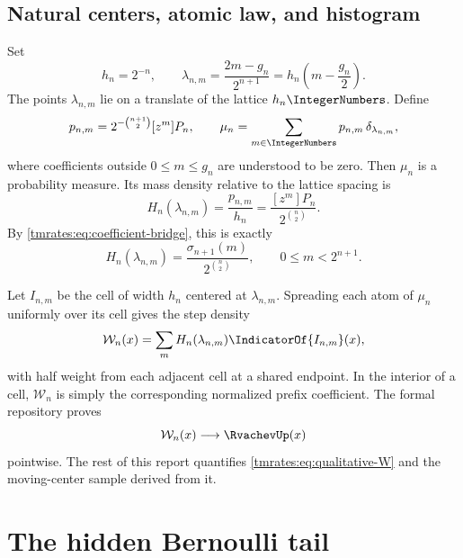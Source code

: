 \documentclass[11pt,oneside]{article}
\theoremstyle{definition}
\theoremstyle{remark}
\begin{document}
\subsection{Natural centers, atomic law, and histogram}

Set
\begin{equation}
 h_n=2^{-n},
 \qquad
 \lambda_{n,m}=\frac{2m-g_n}{2^{n+1}}
 =h_n\left(m-\frac{g_n}{2}\right).                        \label{tmrates:eq:center}
\end{equation}
The points $\lambda_{n,m}$ lie on a translate of the lattice $h_n\IntegerNumbers$.  Define
\begin{equation}
 p_{n,m}=2^{-\binom{n+1}{2}}[z^m]P_n,
 \qquad
 \mu_n=\sum_{m\in\IntegerNumbers}p_{n,m}\,\delta_{\lambda_{n,m}},    \label{tmrates:eq:atomic-law}
\end{equation}
where coefficients outside $0\le m\le g_n$ are understood to be zero.  Then $\mu_n$ is a
probability measure.  Its mass density relative to the lattice spacing is
\begin{equation}
 H_n(\lambda_{n,m})=\frac{p_{n,m}}{h_n}
 =\frac{[z^m]P_n}{2^{\binom n2}}.                          \label{tmrates:eq:Hn}
\end{equation}
By \eqref{tmrates:eq:coefficient-bridge}, this is exactly
\begin{equation}
 H_n(\lambda_{n,m})
 =\frac{\sigma_{n+1}(m)}{2^{\binom n2}},
 \qquad 0\le m<2^{n+1}.                                  \label{tmrates:eq:Hn-prefix}
\end{equation}

Let $I_{n,m}$ be the cell of width $h_n$ centered at $\lambda_{n,m}$.  Spreading each atom of
$\mu_n$ uniformly over its cell gives the step density
\begin{equation}
 \mathcal W_n(x)=\sum_m H_n(\lambda_{n,m})\IndicatorOf{I_{n,m}}(x), \label{tmrates:eq:Wn}
\end{equation}
with half weight from each adjacent cell at a shared endpoint.  In the interior of a cell,
$\mathcal W_n$ is simply the corresponding normalized prefix coefficient.  The formal
repository proves
\begin{equation}
 \mathcal W_n(x)\longrightarrow\RvachevUp(x)                     \label{tmrates:eq:qualitative-W}
\end{equation}
pointwise.  The rest of this report quantifies \eqref{tmrates:eq:qualitative-W} and the moving-center
sample derived from it.

\section{The hidden Bernoulli tail}
\label{tmrates:sec:tail}
\end{document}
